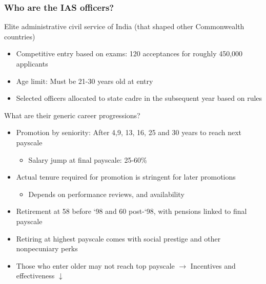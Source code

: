 \documentclass[aspectratio=169]{beamer}
\begin{document}
\begin{frame}
\frametitle{Who are the IAS officers?}
Elite administrative civil service of India (that shaped other Commonwealth countries)
\begin{itemize}\setlength\itemsep{3pt}
\item Competitive entry based on exams: 120 acceptances for roughly 450,000 applicants
\item Age limit: Must be 21-30 years old at entry
\item Selected officers allocated to state cadre in the subsequent year based on rules
\end{itemize}\medskip
What are their generic career progressions?
\begin{itemize}\setlength\itemsep{3pt}
\item Promotion by seniority: After 4,9, 13, 16, 25 and 30 years to reach next payscale
 \begin{itemize}\setlength\itemsep{3pt}
\item Salary jump at final payscale: 25-60\% 
\end{itemize}
\item Actual tenure required for promotion is stringent for later promotions
 \begin{itemize}\setlength\itemsep{3pt}
\item Depends on performance reviews, and availability
\end{itemize}
\item Retirement at 58 before `98 and 60 post-`98, with pensions linked to final payscale
\item Retiring at highest payscale comes with social prestige and other nonpecuniary perks
\item Those who enter older may not reach top payscale $\to$ Incentives and effectiveness $\downarrow$

\end{itemize}
\end{frame}
\end{document}
